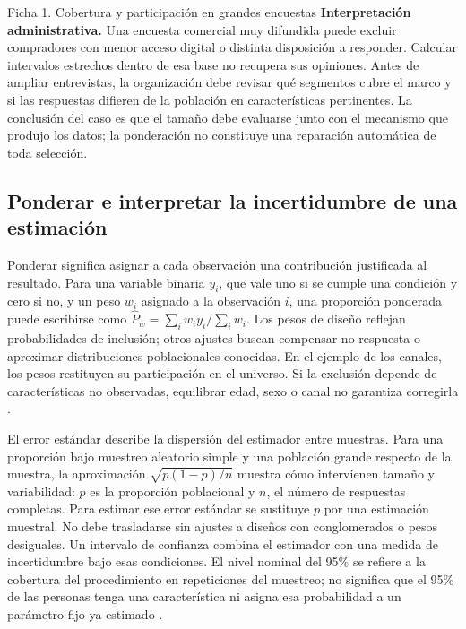 {\begin{fichainvestigacion}{Ficha 1. Cobertura y participación en grandes encuestas}
\textbf{Interpretación administrativa.} Una encuesta comercial muy difundida puede excluir compradores con menor acceso digital o distinta disposición a responder. Calcular intervalos estrechos dentro de esa base no recupera sus opiniones. Antes de ampliar entrevistas, la organización debe revisar qué segmentos cubre el marco y si las respuestas difieren de la población en características pertinentes. La conclusión del caso es que el tamaño debe evaluarse junto con el mecanismo que produjo los datos; la ponderación no constituye una reparación automática de toda selección.
\end{fichainvestigacion}

\subsection{Ponderar e interpretar la incertidumbre de una estimación}
Ponderar significa asignar a cada observación una contribución justificada al resultado. Para una variable binaria $y_i$, que vale uno si se cumple una condición y cero si no, y un peso $w_i$ asignado a la observación $i$, una proporción ponderada puede escribirse como $\widehat P_w=\sum_i w_i y_i/\sum_i w_i$. Los pesos de diseño reflejan probabilidades de inclusión; otros ajustes buscan compensar no respuesta o aproximar distribuciones poblacionales conocidas. En el ejemplo de los canales, los pesos restituyen su participación en el universo. Si la exclusión depende de características no observadas, equilibrar edad, sexo o canal no garantiza corregirla \citep{holmesBusiness2023,bradley2021}.

El error estándar describe la dispersión del estimador entre muestras. Para una proporción bajo muestreo aleatorio simple y una población grande respecto de la muestra, la aproximación $\sqrt{p(1-p)/n}$ muestra cómo intervienen tamaño y variabilidad: $p$ es la proporción poblacional y $n$, el número de respuestas completas. Para estimar ese error estándar se sustituye $p$ por una estimación muestral. No debe trasladarse sin ajustes a diseños con conglomerados o pesos desiguales. Un intervalo de confianza combina el estimador con una medida de incertidumbre bajo esas condiciones. El nivel nominal del 95\% se refiere a la cobertura del procedimiento en repeticiones del muestreo; no significa que el 95\% de las personas tenga una característica ni asigna esa probabilidad a un parámetro fijo ya estimado \citep[secs.~8.1 y 8.3]{holmesBusiness2023}.

}
